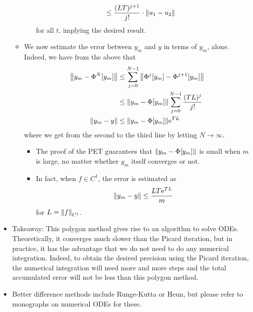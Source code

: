 \documentclass[../notes.tex]{subfiles}
\begin{document}
\begin{itemize}
\begin{itemize}
\begin{itemize}
\begin{align*}
                &\leq \frac{(LT)^{j+1}}{j!}\cdot\norm{u_1-u_2}
            \end{align*}
            for all $t$, implying the desired result.
        \end{itemize}
        \item We now estimate the error between $y_m$ and $y$ in terms of $y_m$, alone. Indeed, we have from the above that
        \begin{align*}
            \norm{y_m-\Phi^N[y_m]} &\leq \sum_{j=0}^{N-1}\norm{\Phi^j[y_m]-\Phi^{j+1}[y_m]}\\
            &\leq \norm{y_m-\Phi[y_m]}\sum_{j=0}^{N-1}\frac{(TL)^j}{j!}\\
            \norm{y_m-y} &\leq \norm{y_m-\Phi[y_m]}\e[TL]
        \end{align*}
        where we get from the second to the third line by letting $N\to\infty$.
        \begin{itemize}
            \item The proof of the PET guarantees that $\norm{y_m-\Phi[y_m]}$ is small when $m$ is large, no matter whether $y_m$ itself converges or not.
            \item In fact, when $f\in C^1$, the error is estimated as
            \begin{equation*}
                \norm{y_m-y} \leq \frac{LT\e[TL]}{m}
            \end{equation*}
            for $L=\norm{f}_{C^1}$.
        \end{itemize}
    \end{itemize}
    \item Takeaway: This polygon method gives rise to an algorithm to solve ODEs. Theoretically, it converges much slower than the Picard iteration, but in practice, it has the advantage that we do not need to do any numerical integration. Indeed, to obtain the desired precision using the Picard iteration, the numerical integration will need more and more steps and the total accumulated error will not be less than this polygon method.
    \item Better difference methods include Runge-Kutta or Heun, but please refer to monographs on numerical ODEs for these.
\end{itemize}
\end{document}
